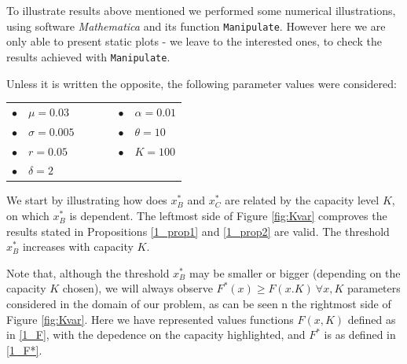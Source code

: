 To illustrate results above mentioned we performed some numerical illustrations, using software \textit{Mathematica} and its function \texttt{Manipulate}. However here we are only able to present static plots - we leave to the interested ones, to check the results achieved with \texttt{Manipulate}.

Unless it is written the opposite, the following parameter values were considered:


\begin{table}[!htb]
	\centering
	\begin{tabular}{lllllll}
		 $\bullet$ & $\mu=0.03$     &  & \hspace{7cm} &  &  $\bullet$ & $\alpha=0.01$ \\
		 $\bullet$ & $\sigma=0.005$ &  & \hspace{7cm} &  &  $\bullet$ & $\theta=10$   \\
		 $\bullet$ & $r=0.05$       &  & \hspace{7cm} &  &  $\bullet$ & $K=100$       \\
		 $\bullet$ & $\delta=2$                                
	\end{tabular}
\end{table}	


We start by illustrating how does $x^*_B$ and $x^*_C$ are related by the capacity level $K$, on which $x^*_B$ is dependent. The leftmost side of Figure \ref{fig:Kvar} comproves the results stated in Propositions \ref{1_prop1} and \ref{1_prop2} are valid. The threshold $x^*_B$ increases with capacity $K$.

Note that, although the threshold $x_B^*$ may be smaller or bigger (depending on the capacity $K$ chosen), we will always observe $F^*(x) \geq F(x.K) \ \forall x, K$ parameters considered in the domain of our problem, as can be seen n the rightmost side of Figure \ref{fig:Kvar}. Here we have represented values functions $F(x,K)$ defined as in \eqref{1_F}, with the depedence on the capacity highlighted, and $F^*$ is as defined in \eqref{1_F*}. 


